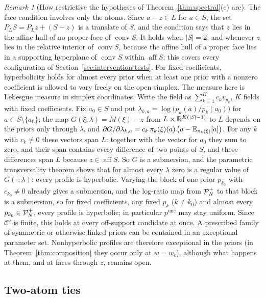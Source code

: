 \documentclass{article} %
\theoremstyle{plain}
\theoremstyle{definition}
\theoremstyle{remark}
\newtheorem{remark}[theorem]{Remark}
\begin{document}
\begin{remark}[How restrictive the hypotheses of Theorem~\ref{thm:spectral}(c) are]
\label{rem:generic}
The face condition involves only the atoms. Since $a-z\in L$ for $a\in S$, the set
$P_LS=P_Lz+(S-z)$ is a translate of $S$, and the condition says that $z$ lies in the affine hull
of no proper face of $\operatorname{conv}S$. It holds when $|S|=2$, and whenever $z$ lies in the
relative interior of $\operatorname{conv}S$, because the affine hull of a proper face lies in a
supporting hyperplane of $\operatorname{conv}S$ within $\operatorname{aff}S$; this covers every
configuration of Section~\ref{sec:intervention-tests}. For fixed coefficients, hyperbolicity
holds for almost every prior when at least one prior with a nonzero coefficient is allowed to vary
freely on the open simplex. The measure here is Lebesgue measure in simplex coordinates.
Write the field as $\sum_{k=1}^Kc_kv_{p_k}$, $K$ fields with fixed coefficients.
Fix $a_0\in S$ and put $\lambda_{k,a}=\log\bigl(p_k(a)/p_k(a_0)\bigr)$ for $a\in S\setminus\{a_0\}$;
the map $G(\xi;\lambda)=M(\xi)-z$ from $L\times\mathbb{R}^{K(|S|-1)}$ to $L$ depends on the priors only
through $\lambda$, and $\partial G/\partial\lambda_{k,a}=c_k\,\pi_k(\xi)(a)\,\bigl(a-\mathbb{E}_{\pi_k(\xi)}[a]\bigr)$.
For any $k$ with $c_k\neq0$ these vectors span $L$: together with the vector for $a_0$ they sum to
zero, and their span contains every difference of two points of $S$, and these differences span
$L$ because $z\in\operatorname{aff}S$. So $G$ is a submersion, and the parametric transversality
theorem \citep[Ch.~2, \S3]{guillemin1974differential} shows that for almost every $\lambda$ zero is a
regular value of $G(\cdot;\lambda)$: every profile is hyperbolic. Varying the block of one prior
$p_{k_0}$ with $c_{k_0}\ne0$ already gives a submersion, and the log-ratio map from $\mathcal{P}_N^{+}$ to that
block is a submersion, so for fixed coefficients, any fixed $p_k$ ($k\ne k_0$) and almost every
$p_{k_0}\in\mathcal{P}_N^{+}$, every profile is hyperbolic; in particular $p^{\mathrm{unc}}$ may stay uniform.
Since $\mathcal C'$ is finite, this holds at every off-support candidate at once. A prescribed
family of symmetric or otherwise linked priors can be contained in an exceptional parameter set. Nonhyperbolic
profiles are therefore exceptional in the priors (in Theorem~\ref{thm:composition} they occur only
at $w=w_c$), although what happens at them, and at
faces through $z$, remains open.
\end{remark}

\subsection{Two-atom ties}
\label{apx:pf-twoatom}
\end{document}
